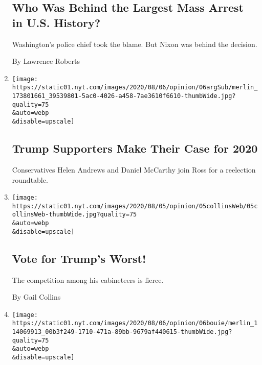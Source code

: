 \begin{enumerate}
  \hypertarget{who-was-behind-the-largest-mass-arrest-in-us-history}{%
  \subsection{Who Was Behind the Largest Mass Arrest in U.S.
  History?}\label{who-was-behind-the-largest-mass-arrest-in-us-history}}

  Washington's police chief took the blame. But Nixon was behind the
  decision.

  By Lawrence Roberts
\item
  \href{/2020/08/06/opinion/the-argument-trump-coronavirus-election.html}{}

  \texttt{[image: https://static01.nyt.com/images/2020/08/06/opinion/06argSub/merlin\_173801661\_39539801-5ac0-4026-a458-7ae3610f6610-thumbWide.jpg?quality=75\\\&auto=webp\\\&disable=upscale]}

  \hypertarget{trump-supporters-make-their-case-for-2020}{%
  \subsection{Trump Supporters Make Their Case for
  2020}\label{trump-supporters-make-their-case-for-2020}}

  Conservatives Helen Andrews and Daniel McCarthy join Ross for a
  reelection roundtable.
\item
  \href{/2020/08/05/opinion/trump-cabinet.html}{}

  \texttt{[image: https://static01.nyt.com/images/2020/08/05/opinion/05collinsWeb/05collinsWeb-thumbWide.jpg?quality=75\\\&auto=webp\\\&disable=upscale]}

  \hypertarget{vote-for-trumps-worst}{%
  \subsection{Vote for Trump's Worst!}\label{vote-for-trumps-worst}}

  The competition among his cabineteers is fierce.

  By Gail Collins
\item
  \href{/2020/08/04/opinion/trump-2020-electoral-college.html}{}

  \texttt{[image: https://static01.nyt.com/images/2020/08/06/opinion/06bouie/merlin\_114069913\_00b3f249-1710-471a-89bb-9679af440615-thumbWide.jpg?quality=75\\\&auto=webp\\\&disable=upscale]}

  \hypertarget{trump-doesnt-need-the-most-votes-what-if-he-doesnt-even-want-them}{%
}
\end{enumerate}
